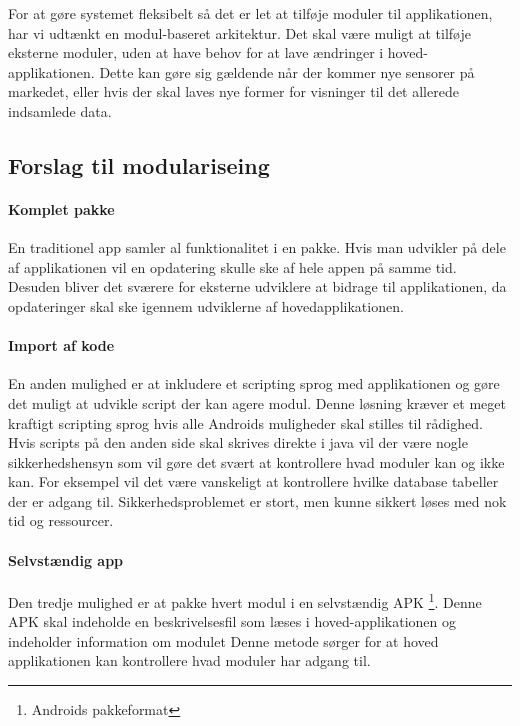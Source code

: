 
For at gøre systemet fleksibelt så det er let at tilføje moduler til applikationen, har vi udtænkt en modul-baseret arkitektur.
Det skal være muligt at tilføje eksterne moduler, uden at have behov for at lave ændringer i hoved-applikationen.
Dette kan gøre sig gældende når der kommer nye sensorer på markedet, eller hvis der skal laves nye former for visninger til det allerede indsamlede data.

\subsection{Forslag til modulariseing}
\paragraph{Komplet pakke}
En traditionel app samler al funktionalitet i en pakke.
Hvis man udvikler på dele af applikationen vil en opdatering skulle ske af hele appen på samme tid.
Desuden bliver det sværere for eksterne udviklere at bidrage til applikationen, da opdateringer skal ske igennem udviklerne af hovedapplikationen.

\paragraph{Import af kode}
En anden mulighed er at inkludere et scripting sprog med applikationen og gøre det muligt at udvikle script der kan agere modul.
Denne løsning kræver et meget kraftigt scripting sprog hvis alle Androids muligheder skal stilles til rådighed.
Hvis scripts på den anden side skal skrives direkte i java vil der være nogle sikkerhedshensyn som vil gøre det svært at kontrollere hvad moduler kan og ikke kan.
For eksempel vil det være vanskeligt at kontrollere hvilke database tabeller der er adgang til.
Sikkerhedsproblemet er stort, men kunne sikkert løses med nok tid og ressourcer.

\paragraph{Selvstændig app}
Den tredje mulighed er at pakke hvert modul i en selvstændig APK \footnote{Androids pakkeformat}.
Denne APK skal indeholde en beskrivelsesfil som læses i hoved-applikationen og indeholder information om modulet
Denne metode sørger for at hoved applikationen kan kontrollere hvad moduler har adgang til. 

